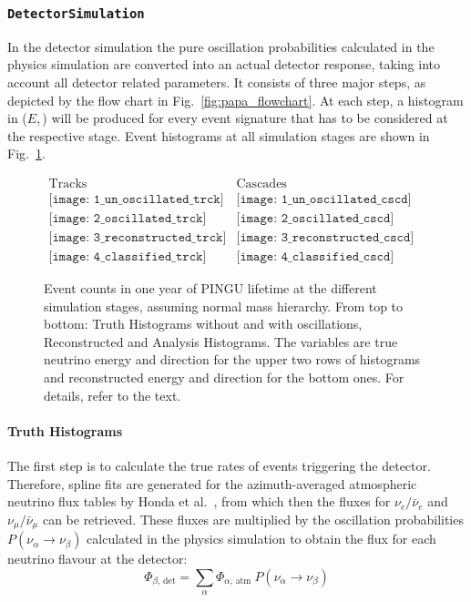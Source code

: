 \subsubsection{\texttt{DetectorSimulation}}

In the detector simulation the pure oscillation probabilities calculated in the
physics simulation are converted into an actual detector response, taking into
account all detector related parameters. It consists of three major steps, as
depicted by the flow chart in Fig.~\ref{fig:papa_flowchart}. At each step, a 
histogram in ($E$,\,\coszen) will be produced for every event signature that has 
to be considered at the respective stage. Event
histograms at all simulation stages are shown in Fig.~\ref{fig:SimSteps}.

\begin{figure}
 \centering
 $\begin{array}{cc}
   \mathrm{Tracks} &
   \mathrm{Cascades}\\
   \texttt{[image: 1\_un\_oscillated\_trck]} &
   \texttt{[image: 1\_un\_oscillated\_cscd]}\\
   \texttt{[image: 2\_oscillated\_trck]} &
   \texttt{[image: 2\_oscillated\_cscd]}\\
   \texttt{[image: 3\_reconstructed\_trck]} &
   \texttt{[image: 3\_reconstructed\_cscd]}\\
   \texttt{[image: 4\_classified\_trck]} &
   \texttt{[image: 4\_classified\_cscd]}
  \end{array}$
 \caption{Event counts in one year of PINGU lifetime at the different
  simulation stages, assuming normal mass hierarchy. From top to bottom: 
  Truth Histograms without and with oscillations, Reconstructed and Analysis 
  Histograms. The variables are true neutrino energy and direction for the
  upper two rows of histograms and reconstructed energy and direction for the
  bottom ones. For details, refer to the text.}
 \label{fig:SimSteps}
\end{figure}

\paragraph{Truth Histograms}

The first step is to calculate the true rates of events triggering the
detector. Therefore, spline fits are generated for the azimuth-averaged
atmospheric neutrino flux tables by Honda et al.\ \cite{Honda,
HondaSP}, from which then the fluxes for $\nu_e/\bar\nu_e$ and
$\nu_\mu/\bar\nu_\mu$ can be retrieved. These fluxes are multiplied by the
oscillation probabilities $P(\nu_\alpha \to \nu_\beta)$ calculated in the
physics simulation to obtain the flux for each neutrino flavour at the
detector:
\begin{equation}
 \Phi_{\beta,\,\mathrm{det}} =
   \sum_\alpha \Phi_{\alpha,\,\mathrm{atm}}\ P(\nu_\alpha\to\nu_\beta)
 \label{eqn:detetor_flux}
\end{equation}

